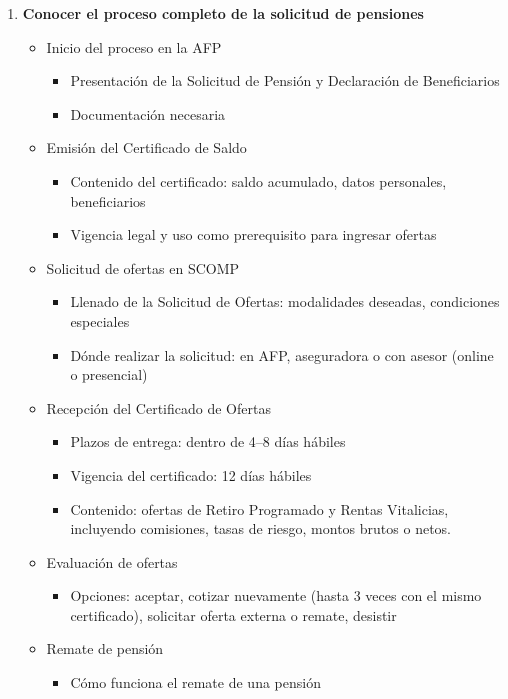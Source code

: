 \begin{enumerate}
\item \textbf{Conocer el proceso completo de la solicitud de pensiones}
\begin{itemize}
    \item Inicio del proceso en la AFP
    \begin{itemize}
        \item Presentación de la Solicitud de Pensión y Declaración de Beneficiarios
        \item Documentación necesaria
    \end{itemize}
    \item Emisión del Certificado de Saldo
    \begin{itemize}
        \item Contenido del certificado: saldo acumulado, datos personales, beneficiarios
        \item Vigencia legal y uso como prerequisito para ingresar ofertas
    \end{itemize}
    \item Solicitud de ofertas en SCOMP
    \begin{itemize}
        \item Llenado de la Solicitud de Ofertas: modalidades deseadas, condiciones especiales
        \item Dónde realizar la solicitud: en AFP, aseguradora o con asesor (online o presencial)
    \end{itemize}
    \item Recepción del Certificado de Ofertas
    \begin{itemize}
        \item Plazos de entrega: dentro de 4–8 días hábiles
        \item Vigencia del certificado: 12 días hábiles
        \item Contenido: ofertas de Retiro Programado y Rentas Vitalicias, incluyendo comisiones, tasas de riesgo, montos brutos o netos. 
    \end{itemize}
    \item Evaluación de ofertas
    \begin{itemize}
        \item Opciones: aceptar, cotizar nuevamente (hasta 3 veces con el mismo certificado), solicitar oferta externa o remate, desistir
    \end{itemize}
    \item Remate de pensión
    \begin{itemize}
        \item Cómo funciona el remate de una pensión

\end{itemize}
\end{itemize}
\end{enumerate}
